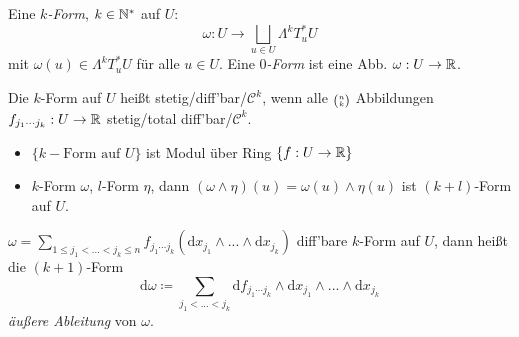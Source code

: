 \documentclass{cheat-sheet}
\let\myBinom\binom
\renewcommand{\binom}[2]{\mathsmaller{\myBinom{#1}{#2}}}
\begin{document}
\begin{defn}
  Eine \emph{$k$-Form}, $k \in \mathbb{N}^*$ auf $U$:
  \[ \omega : U \to \bigsqcup_{u \in U} \Lambda^k T_u^* U \]
  mit $\omega(u) \in \Lambda^k T_u^* U$ für alle $u \in U$.
  Eine \emph{$0$-Form} ist eine Abb. $\omega : U \to \mathbb{R}$.
\end{defn}



\begin{defn}
  Die $k$-Form auf $U$ heißt stetig/diff'bar/$\mathcal{C}^k$, wenn alle $\binom{n}{k}$ Abbildungen $f_{j_1 \cdots j_k} : U \to \mathbb{R}$ stetig/total diff'bar/$\mathcal{C}^k$.
\end{defn}

\begin{beobachtung}
  \begin{itemize}
    \item $\{ k-\text{Form auf } U \}$ ist Modul über Ring $\{ f : U \to \mathbb{R} \}$
    \item $k$-Form $\omega$, $l$-Form $\eta$, dann $(\omega \wedge \eta)(u) = \omega(u) \wedge \eta(u)$ ist $(k+l)$-Form auf $U$.
  \end{itemize}
\end{beobachtung}

\begin{defn}
  $\omega = \sum_{1 \leq j_1 < ... < j_k \leq n} f_{j_1 \cdots j_k} (\mathrm{d}x_{j_1} \wedge ... \wedge \mathrm{d}x_{j_k})$ diff'bare $k$-Form auf $U$, dann heißt die $(k+1)$-Form
  \[ \mathrm{d} \omega \coloneqq \sum_{j_1 < ... < j_k} \mathrm{d} f_{j_1 \cdots j_k} \wedge \mathrm{d} x_{j_1} \wedge ... \wedge \mathrm{d} x_{j_k} \]
  \emph{äußere Ableitung} von $\omega$.
\end{defn}
\end{document}
